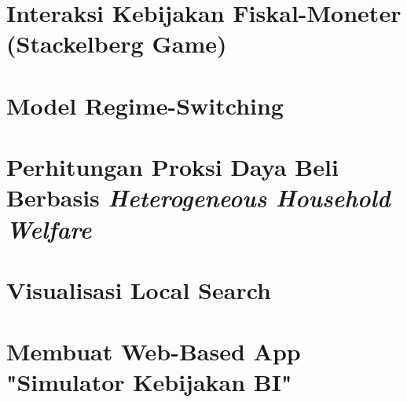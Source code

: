 \section{Interaksi Kebijakan Fiskal-Moneter (Stackelberg Game)}

\section{Model Regime-Switching}

\section{Perhitungan Proksi Daya Beli Berbasis \textit{Heterogeneous Household Welfare}}

\section{Visualisasi Local Search}

\section{Membuat Web-Based App "Simulator Kebijakan BI"}